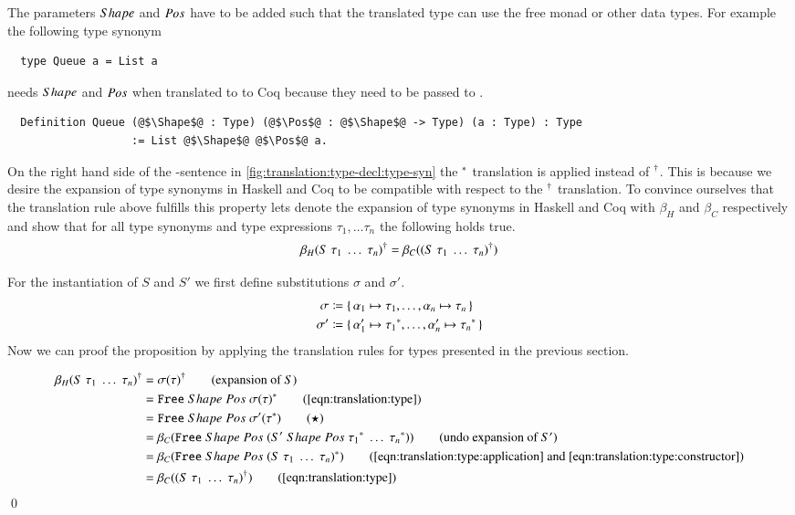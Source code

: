 The parameters $Shape$ and $Pos$ have to be added such that the translated type can use the free monad or other data types.
For example the following type synonym
\begin{verbatim}
  type Queue a = List a
\end{verbatim}
needs $Shape$ and $Pos$ when translated to to Coq because they need to be passed to .
\begin{verbatim}
  Definition Queue (@$\Shape$@ : Type) (@$\Pos$@ : @$\Shape$@ -> Type) (a : Type) : Type
                   := List @$\Shape$@ @$\Pos$@ a.
\end{verbatim}

On the right hand side of the -sentence in \autoref{fig:translation:type-decl:type-syn} the ${}^{*}$ translation is applied instead of ${}^{\dagger}$.
This is because we desire the expansion of type synonyms in Haskell and Coq to be compatible with respect to the ${}^{\dagger}$ translation.
To convince ourselves that the translation rule above fulfills this property lets denote the expansion of type synonyms in Haskell and Coq with $\beta_H$ and $\beta_C$ respectively and show that for all type synonyms  and type expressions $\tau_1, \ldots \tau_n$ the following holds true.
\[
  {\beta_H(S\;\tau_1\;\ldots\;\tau_n)}^{\dagger}
  = \beta_C({(S\;\tau_1\;\ldots\;\tau_n)}^{\dagger})
\]

For the instantiation of $S$ and $S'$ we first define substitutions $\sigma$ and $\sigma'$.
\begin{align*}
  \sigma &\coloneqq \{\, \alpha_1 \mapsto \tau_1, \ldots, \alpha_n \mapsto \tau_n \,\} \\
  \sigma' &\coloneqq \{\, \alpha_1' \mapsto {\tau_1}^{*}, \ldots, \alpha_n' \mapsto {\tau_n}^{*} \,\}
\end{align*}
Now we can proof the proposition by applying the translation rules for types presented in the previous section.

\begin{align*}
  \toCoq{\beta_H(S\;\tau_1\;\ldots\;\tau_n)}
    &= \toCoq{\sigma(\tau)}
       \tag{expansion of $S$} \\
    &= \Free{\toCoqT{\sigma(\tau)}}
       \tag{\autoref{eqn:translation:type}} \\
    &= \Free{\sigma'(\toCoqT{\tau})}
       \tag{$\star$} \\
    &= \beta_C{(\Free{(\genApply{S'}\;\toCoqT{\tau_1}\;\ldots\;\toCoqT{\tau_n})})}
       \tag{undo expansion of $S'$} \\
    &= \beta_C{(\Free{\toCoqT{(S\;\tau_1\;\ldots\;\tau_n)}})}
       \tag{\autoref{eqn:translation:type:application} and \ref{eqn:translation:type:constructor}} \\
    &= \beta_C(\toCoq{(S\;\tau_1\;\ldots\;\tau_n)})
       \tag{\autoref{eqn:translation:type}}
\end{align*}
\qed


